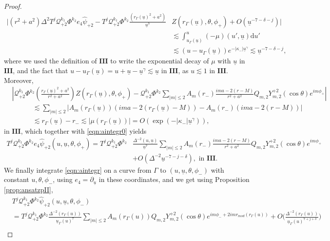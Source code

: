 \documentclass[10pt,a4paper]{amsart}
\newcommand{\carterp}{\mcq_{+2}}
\newcommand{\dee}{\mathrm{d}}
\newcommand{\mcq}{\mathcal{Q}}
\newcommand{\psihatp}{\psihat_{+2}}
\newcommand{\psihat}{\widehat{\psi}}
\newcommand{\sfrak}{2}
\newcommand{\trois}{\mathbf{III}}
\newcommand{\ubar}{{\underline{u}}}
\begin{document}
\begin{proof}
\begin{align}
    \Bigg|(r^2+a^2)\Delta^2T^j\carterp^{k_1}\Phi^{k_2}e_4\psihatp\nonumber-T^j\carterp^{k_1}\Phi^{k_2}\frac{(r_\Gamma(\ubar)^2+a^2)}{\ubar^7}&Z(r_\Gamma(\ubar),\theta,\phi_{+})+O(\ubar^{-7-\delta-j})\Bigg|\\
    &\lesssim\int_{u_\Gamma(\ubar)}^u(-\mu)(u',\ubar)\dee u'\nonumber\\
    &\lesssim(u-u_\Gamma(\ubar))e^{-|\kappa_-|\ubar^\gamma}\lesssim\ubar^{-7-\delta-j},\label{eqn:aintegr0}
\end{align}
where we used the definition of $\trois$ to write the exponential decay of $\mu$ with $\ubar$ in $\trois$, and the fact that $u-u_\Gamma(\ubar)=u+\ubar-\ubar^\gamma\lesssim\ubar$ in $\trois$, as $u\lesssim 1$ in $\trois$. Moreover, 
\begin{align}
    &\left|\carterp^{k_1}\Phi^{k_2}\left(\frac{r_\Gamma(\ubar)^2+a^2}{r^2+a^2}\right)Z(r_\Gamma(\ubar),\theta,\phi_{+})-\carterp^{k_1}\Phi^{k_2}\sum_{|m|\leq2}A_m(r_-)\frac{ima-2(r-M)}{r^2+a^2}Q_{m,\sfrak}Y_{m,\sfrak}^{+\sfrak}(\cos\theta)e^{im\phi_{+}}\right|\nonumber\\
    &\quad\quad\quad\lesssim\sum_{|m|\leq2}|A_m(r_\Gamma(\ubar))(ima-2(r_\Gamma(\ubar)-M))-A_m(r_-)(ima-2(r-M))|\nonumber\\
    &\quad\quad\quad\lesssim r_\Gamma(\ubar)-r_-\lesssim|\mu(r_\Gamma(\ubar))|=O(\exp(-|\kappa_-|\ubar^\gamma)),\nonumber
\end{align}
in $\trois$, which together with \eqref{eqn:aintegr0} yields
\begin{align}\label{eqn:aintegr}
    T^j\carterp^{k_1}\Phi^{k_2}e_4\psihatp(u,\ubar,\theta,\phi_{+})=T^j\carterp^{k_1}\Phi^{k_2}&\frac{\Delta^{-2}(u,\ubar)}{\ubar^7}\sum_{|m|\leq2}A_m(r_-)\frac{ima-2(r-M)}{r^2+a^2}Q_{m,\sfrak}Y_{m,\sfrak}^{+\sfrak}(\cos\theta)e^{im\phi_{+}}\nonumber\\
    &+O(\Delta^{-2}\ubar^{-7-j-\delta}),\text{   in   }\trois.
\end{align}
We finally integrate \eqref{eqn:aintegr} on a curve from $\Gamma$ to $(u,\ubar,\theta,\phi_{-})$ with  constant $u,\theta,\phi_{-}$, using $e_4=\partial_\ubar$ in these coordinates, and we get using Proposition \ref{prop:ansatzpII},
\begin{align}
    &T^j\carterp^{k_1}\Phi^{k_2}\psihatp(u,\ubar,\theta,\phi_{-})\nonumber\\
    &=T^j\carterp^{k_1}\Phi^{k_2}\frac{\Delta^{-2}(r_\Gamma(u))}{\ubar_\Gamma(u)^7}\sum_{|m|\leq2}A_m(r_\Gamma(u))Q_{m,\sfrak}Y_{m,\sfrak}^{+\sfrak}(\cos\theta)e^{im\phi_{-}+2imr_{mod}(r_\Gamma(u))}+O\Bigg(\frac{\Delta^{-2}(r_\Gamma(u))}{\ubar_\Gamma(u)^{7+j+\delta}}\Bigg)\nonumber\\

\end{align}
\end{proof}
\end{document}
